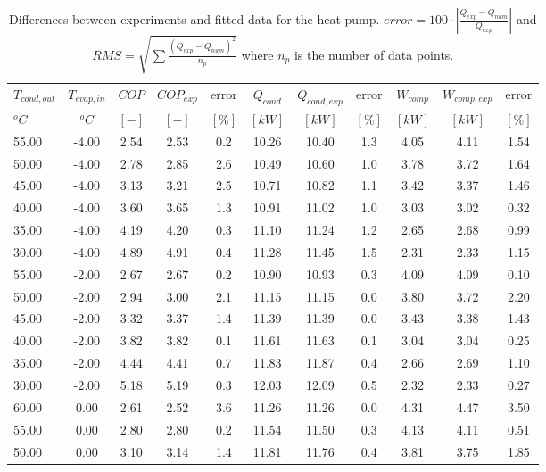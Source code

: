 \documentclass[english]{SPFShortReport}
\begin{document}
\begin{table}[!ht]
\centering
\caption{Differences between experiments and fitted data for the heat pump.          $error=100 \cdot |\frac{Q_{exp}-Q_{num}}{Q_{exp}}|$ and $RMS = \sqrt { \sum{\frac{(Q_{exp}-Q_{num})^2}{n_p}} }$ where $n_p$ is the number of data points.}
\begin{adjustbox}{max width =\textwidth}
\begin{tabular}{l | c c c c c c c c c c } 
\hline
\hline
$T_{cond,out}$ &$T_{evap,in}$ &$COP$ &$COP_{exp}$ &error &$Q_{cond}$ &$Q_{cond,exp}$ &error &$W_{comp}$ &$W_{comp,exp}$ &error \\ 
$^oC$ &$^oC$ &$[-]$ &$[-]$ &$[\%]$ &$[kW]$ &$[kW]$ &$[\%]$ &$[kW]$ &$[kW]$ &$[\%]$\\ 
\hline
55.00  & -4.00 & 2.54 & 2.53 & 0.2 & 10.26 & 10.40 & 1.3 & 4.05 & 4.11 & 1.54\\ 
50.00  & -4.00 & 2.78 & 2.85 & 2.6 & 10.49 & 10.60 & 1.0 & 3.78 & 3.72 & 1.64\\ 
45.00  & -4.00 & 3.13 & 3.21 & 2.5 & 10.71 & 10.82 & 1.1 & 3.42 & 3.37 & 1.46\\ 
40.00  & -4.00 & 3.60 & 3.65 & 1.3 & 10.91 & 11.02 & 1.0 & 3.03 & 3.02 & 0.32\\ 
35.00  & -4.00 & 4.19 & 4.20 & 0.3 & 11.10 & 11.24 & 1.2 & 2.65 & 2.68 & 0.99\\ 
30.00  & -4.00 & 4.89 & 4.91 & 0.4 & 11.28 & 11.45 & 1.5 & 2.31 & 2.33 & 1.15\\ 
55.00  & -2.00 & 2.67 & 2.67 & 0.2 & 10.90 & 10.93 & 0.3 & 4.09 & 4.09 & 0.10\\ 
50.00  & -2.00 & 2.94 & 3.00 & 2.1 & 11.15 & 11.15 & 0.0 & 3.80 & 3.72 & 2.20\\ 
45.00  & -2.00 & 3.32 & 3.37 & 1.4 & 11.39 & 11.39 & 0.0 & 3.43 & 3.38 & 1.43\\ 
40.00  & -2.00 & 3.82 & 3.82 & 0.1 & 11.61 & 11.63 & 0.1 & 3.04 & 3.04 & 0.25\\ 
35.00  & -2.00 & 4.44 & 4.41 & 0.7 & 11.83 & 11.87 & 0.4 & 2.66 & 2.69 & 1.10\\ 
30.00  & -2.00 & 5.18 & 5.19 & 0.3 & 12.03 & 12.09 & 0.5 & 2.32 & 2.33 & 0.27\\ 
60.00  & 0.00 & 2.61 & 2.52 & 3.6 & 11.26 & 11.26 & 0.0 & 4.31 & 4.47 & 3.50\\ 
55.00  & 0.00 & 2.80 & 2.80 & 0.2 & 11.54 & 11.50 & 0.3 & 4.13 & 4.11 & 0.51\\ 
50.00  & 0.00 & 3.10 & 3.14 & 1.4 & 11.81 & 11.76 & 0.4 & 3.81 & 3.75 & 1.85\\ 

\end{tabular}
\end{adjustbox}
\end{table}
\end{document}
